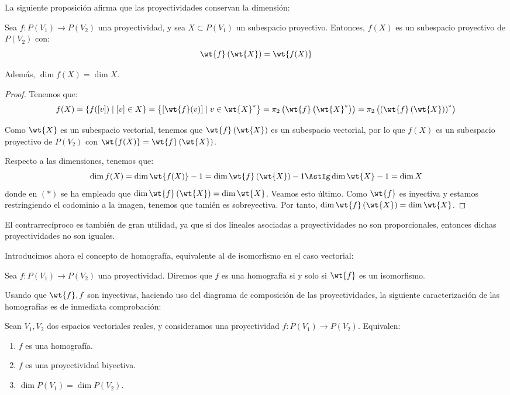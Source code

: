 La siguiente proposición afirma que las proyectividades conservan la dimensión:
\begin{prop}
    Sea $f:P(V_1)\to P(V_2)$ una proyectividad, y sea $X\subset P(V_1)$ un subespacio proyectivo. Entonces, $f(X)$ es un subespacio proyectivo de $P(V_2)$ con:
    \begin{equation*}
        \wt{f}\left(\wt{X}\right) = \wt{f(X)}
    \end{equation*}

    Además, $\dim f(X) = \dim X$.
\end{prop}
\begin{proof}
    Tenemos que: $$f(X)=\{f([v]) \mid [v]\in X\} = \left\{\left[\wt{f}(v)\right] \mid v\in \wt{X}^\ast\right\} = \pi_2\left(\wt{f}\left(\wt{X}^\ast\right)\right) = \pi_2\left(\left(\wt{f}\left(\wt{X}\right)\right)^\ast\right)$$

    Como $\wt{X}$ es un subespacio vectorial, tenemos que $\wt{f}\left(\wt{X}\right)$ es un subespacio vectorial, por lo que $f(X)$ es un subespacio proyectivo de $P(V_2)$ con $\wt{f(X)}=\wt{f}\left(\wt{X}\right)$.

    Respecto a las dimensiones, tenemos que: $$\dim f(X) = \dim \wt{f(X)} - 1 = \dim \wt{f}\left(\wt{X}\right) - 1 \AstIg \dim \wt{X} - 1 = \dim X$$
    donde en $(\ast)$ se ha empleado que $\dim \wt{f}\left(\wt{X}\right) = \dim \wt{X}$. Veamos esto último. Como $\wt{f}$ es inyectiva y estamos restringiendo el codominio a la imagen, tenemos que tamién es sobreyectiva. Por tanto, $\dim \wt{f}\left(\wt{X}\right) = \dim \wt{X}$.
\end{proof}
\begin{observacion}
    El contrarrecíproco es también de gran utilidad, ya que si dos lineales
    asociadas a proyectividades no son proporcionales, entonces dichas proyectividades
    no son iguales.
\end{observacion}

Introducimos ahora el concepto de homografía, equivalente al de isomorfismo en el caso vectorial:
\begin{definicion}[Homografía]
    Sea $f:P(V_1)\to P(V_2)$ una proyectividad. Diremos que $f$ es una homografía si y solo si $\wt{f}$ es un isomorfismo.
\end{definicion}

Usando que $\wt{f},f$ son inyectivas, haciendo uso del diagrama de composición de las proyectividades, la siguiente caracterización de las homografías es de inmediata comprobación:
\begin{prop}
    Sean $V_1,V_2$ dos espacios vectoriales reales, y consideramos una proyectividad $f:P(V_1)\to P(V_2)$. Equivalen:
    \begin{enumerate}
        \item $f$ es una homografía.
        \item $f$ es una proyectividad biyectiva.
        \item $\dim P(V_1) = \dim P(V_2)$.
    \end{enumerate}
\end{prop}

